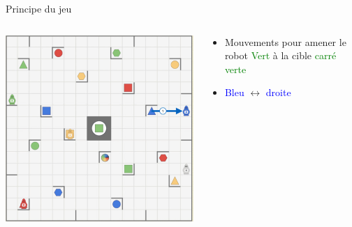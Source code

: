 \documentclass{beamer}
\begin{document}
\begin{frame}{Principe du jeu}
    \begin{columns}
        \begin{column}{0.6\textwidth}
        \vspace{\topsep}
        \includegraphics[scale=0.4]{Images/r3.png}%
        \end{column}
        
        \begin{column}{0.4\textwidth}
        \begin{itemize}
        \item Mouvements pour amener le robot \textcolor{green}{Vert} à la cible \textcolor{green}{carré verte}
        \item \textcolor{blue}{Bleu} $\longleftrightarrow$ \textcolor{blue}{droite}
        \end{itemize}
        \end{column}
    \end{columns}
\end{frame}
\end{document}
